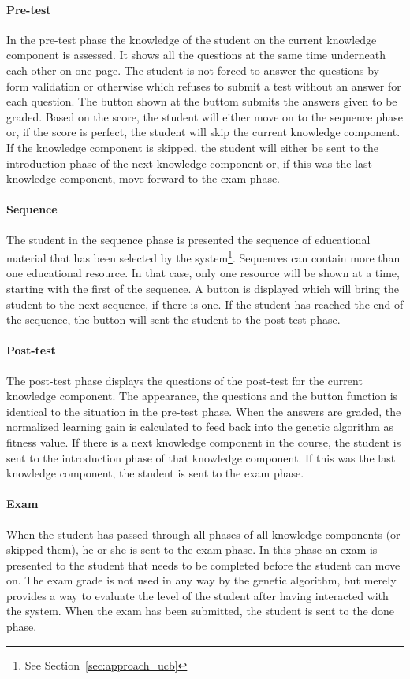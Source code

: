 \paragraph{Pre-test} In the pre-test phase the knowledge of the student on the
current knowledge component is assessed. It shows all the questions at the same
time underneath each other on one page. The student is not forced to answer the
questions by form validation or otherwise which refuses to submit a test
without an answer for each question. The button shown at the buttom submits the
answers given to be graded. Based on the score, the student will either move on
to the sequence phase or, if the score is perfect, the student will skip the
current knowledge component. If the knowledge component is skipped, the student
will either be sent to the introduction phase of the next knowledge component
or, if this was the last knowledge component, move forward to the exam phase.
\paragraph{Sequence} The student in the sequence phase is presented the
sequence of educational material that has been selected by the
system\footnote{See Section~\ref{sec:approach_ucb}}. Sequences can contain more
than one educational resource. In that case, only one resource will be shown at
a time, starting with the first of the sequence. A button is displayed which
will bring the student to the next sequence, if there is one. If the student
has reached the end of the sequence, the button will sent the student to the
post-test phase.
\paragraph{Post-test} The post-test phase displays the questions of the
post-test for the current knowledge component. The appearance, the questions
and the button function is identical to the situation in the pre-test phase.
When the answers are graded, the normalized learning gain is calculated to
feed back into the genetic algorithm as fitness value. If there is a next
knowledge component in the course, the student is sent to the introduction
phase of that knowledge component. If this was the last knowledge component,
the student is sent to the exam phase.
\paragraph{Exam} When the student has passed through all phases of all
knowledge components (or skipped them), he or she is sent to the exam phase. In
this phase an exam is presented to the student that needs to be completed
before the student can move on. The exam grade is not used in any way by the
genetic algorithm, but merely provides a way to evaluate the level of the
student after having interacted with the system. When the exam has been
submitted, the student is sent to the done phase.

